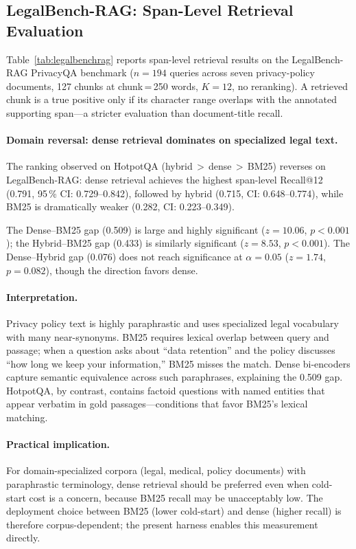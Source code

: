 \documentclass[11pt,a4paper]{article}
\begin{document}
\subsection{LegalBench-RAG: Span-Level Retrieval Evaluation}
\label{sec:legalbench_results}



Table~\ref{tab:legalbenchrag} reports span-level retrieval results on the
LegalBench-RAG PrivacyQA benchmark ($n=194$ queries across seven privacy-policy
documents, 127 chunks at chunk\,=\,250 words, $K=12$, no reranking).
A retrieved chunk is a true positive only if its character range overlaps with
the annotated supporting span---a stricter evaluation than document-title recall.

\paragraph{Domain reversal: dense retrieval dominates on specialized legal text.}
The ranking observed on HotpotQA (hybrid\,$>$\,dense\,$>$\,BM25) reverses on
LegalBench-RAG: dense retrieval achieves the highest span-level Recall@12
(0.791, 95\,\% CI: 0.729--0.842), followed by hybrid (0.715,
CI: 0.648--0.774), while BM25 is dramatically weaker (0.282,
CI: 0.223--0.349).

The Dense--BM25 gap (0.509) is large and highly significant
($z=10.06$, $p<0.001$); the Hybrid--BM25 gap (0.433) is similarly significant
($z=8.53$, $p<0.001$).
The Dense--Hybrid gap (0.076) does not reach significance at $\alpha=0.05$
($z=1.74$, $p=0.082$), though the direction favors dense.

\paragraph{Interpretation.}
Privacy policy text is highly paraphrastic and uses specialized legal
vocabulary with many near-synonyms.
BM25 requires lexical overlap between query and passage; when a question asks
about ``data retention'' and the policy discusses ``how long we keep your
information,'' BM25 misses the match.
Dense bi-encoders capture semantic equivalence across such paraphrases,
explaining the 0.509 gap.
HotpotQA, by contrast, contains factoid questions with named entities that
appear verbatim in gold passages---conditions that favor BM25's lexical
matching.

\paragraph{Practical implication.}
For domain-specialized corpora (legal, medical, policy documents) with
paraphrastic terminology, dense retrieval should be preferred even when
cold-start cost is a concern, because BM25 recall may be unacceptably low.
The deployment choice between BM25 (lower cold-start) and dense (higher recall)
is therefore corpus-dependent; the present harness enables this measurement
directly.
\end{document}
